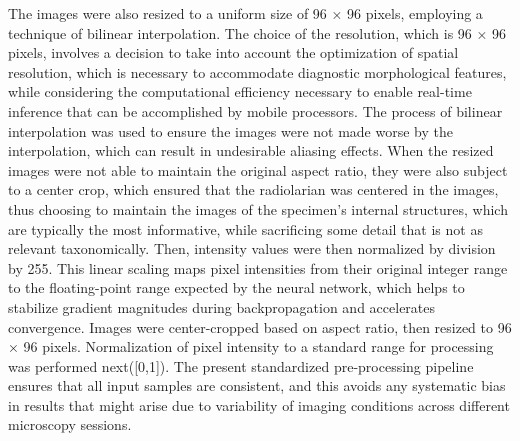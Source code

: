 \documentclass[a4paper,fleqn]{cas-sc}
\begin{document}
The images were also resized to a uniform size of 96 × 96 pixels, employing a technique of bilinear interpolation. The choice of the resolution, which is 96 × 96 pixels, involves a decision to take into account the optimization of spatial resolution, which is necessary to accommodate diagnostic morphological features, while considering the computational efficiency necessary to enable real-time inference that can be accomplished by mobile processors. The process of bilinear interpolation was used to ensure the images were not made worse by the interpolation, which can result in undesirable aliasing effects. When the resized images were not able to maintain the original aspect ratio, they were also subject to a center crop, which ensured that the radiolarian was centered in the images, thus choosing to maintain the images of the specimen's internal structures, which are typically the most informative, while sacrificing some detail that is not as relevant taxonomically.
Then, intensity values were then normalized by division by 255. This linear scaling maps pixel intensities from their original integer range to the floating-point range expected by the neural network, which helps to stabilize gradient magnitudes during backpropagation and accelerates convergence. Images were center-cropped based on aspect ratio, then resized to 96 × 96 pixels. Normalization of pixel intensity to a standard range for processing was performed next([0,1]). The present standardized pre-processing pipeline ensures that all input samples are consistent, and this avoids any systematic bias in results that might arise due to variability of imaging conditions across different microscopy sessions.
\end{document}
